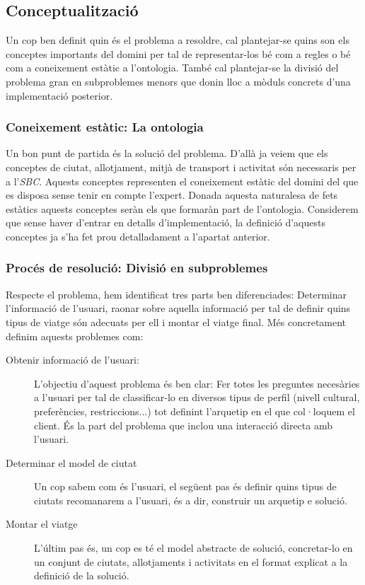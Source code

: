 \documentclass[11pt,a4paper]{article}
\begin{document}
\subsection{Conceptualització}
Un cop ben definit quin és el problema a resoldre, cal plantejar-se quins son els conceptes importants del domini per tal de representar-los bé com a regles o bé com a coneixement estàtic a l'ontologia. També cal plantejar-se la divisió del problema gran en subproblemes menors que donin lloc a mòduls concrets d'una implementació posterior.

\subsubsection{Coneixement estàtic: La ontologia}

Un bon punt de partida és la solució del problema. D'allà ja veiem que els conceptes de ciutat, allotjament, mitjà de transport i activitat són necessaris per a l'\emph{SBC}. Aquests conceptes representen el coneixement estàtic del domini del que es disposa sense tenir en compte l'expert. Donada aquesta naturalesa de fets estàtics aquests conceptes seràn els que formaràn part de l'ontologia. Considerem que sense haver d'entrar en detalls d'implementació, la definició d'aquests conceptes ja s'ha fet prou detalladament a l'apartat anterior.

\subsubsection{Procés de resolució: Divisió en subproblemes}
\label{sec:subprob_informal}

Respecte el problema, hem identificat tres parts ben diferenciades: Determinar l'informació de l'usuari, raonar sobre aquella informació per tal de definir quins tipus de viatge són adecuats per ell i montar el viatge final. Més concretament definim aquests problemes com:

\begin{description}
	\item[Obtenir informació de l'usuari:] L'objectiu d'aquest problema és ben clar: Fer totes les preguntes necesàries a l'usuari per tal de classificar-lo en diversos tipus de perfil (nivell cultural, preferències, restriccions...) tot definint l'arquetip en el que col·loquem el client. És la part del problema que inclou una interacció directa amb l'usuari. 

	\item[Determinar el model de ciutat] Un cop sabem com és l'usuari, el següent pas és definir quins tipus de ciutats recomanarem a l'usuari, és a dir, construir un arquetip e solució.

	\item[Montar el viatge] L'últim pas és, un cop es té el model abstracte de solució, concretar-lo en un conjunt de ciutats, allotjaments i activitats en el format explicat a la definició de la solució.
\end{description}
\end{document}
